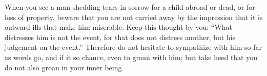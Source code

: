 When you see a man shedding tears in  sorrow for a child abroad or dead, or for
loss of property, beware  that you are not carried away  by the impression that
it is outward  ills that make him  miserable. Keep this thought  by you: ``What
distresses him is  not the event, for  that does not distress  another, but his
judgement on the  event.'' Therefore do not hesitate to  sympathize with him so
far as  words go, and if  it so chance, even  to groan with him;  but take heed
that you do not also groan in your inner being.
